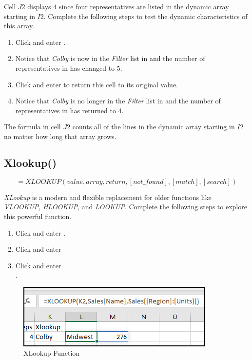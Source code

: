 Cell $ J2 $ displays $ 4 $ since four representatives are listed in the dynamic array starting in $ I2 $. Complete the following steps to test the dynamic characteristics of this array.

\begin{enumbox}
	\begin{enumerate}
		\item Click  and enter .
		\item Notice that \textit{Colby} is now in the \textit{Filter} list in  and the number of representatives in  has changed to $ 5 $.
		\item Click  and enter  to return this cell to its original value.
		\item Notice that \textit{Colby} is no longer in the \textit{Filter} list in  and the number of representatives in  has returned to $ 4 $.
	\end{enumerate}
\end{enumbox}

The formula in cell $ J2 $ counts all of the lines in the dynamic array starting in $ I2 $ no matter how long that array grows.

\subsection{Xlookup()}

\[ =XLOOKUP(value, array, return, [not\_found], [match], [search]) \]

\textit{XLookup} is a modern and flexible replacement for older functions like \textit{VLOOKUP}, \textit{HLOOKUP}, and \textit{LOOKUP}. Complete the following steps to explore this powerful function.

\begin{enumbox}
	\begin{enumerate}
		\item Click  and enter .
		\item Click  and enter 
		\item Click  and enter \\ .
	\end{enumerate}
\end{enumbox}

\begin{figure}[H]
	\centering
	\includegraphics[width=\maxwidth{.75\linewidth}]{gfx/apb_fig05}
	\caption{XLookup Function}
	\label{apb:fig05}
\end{figure}

